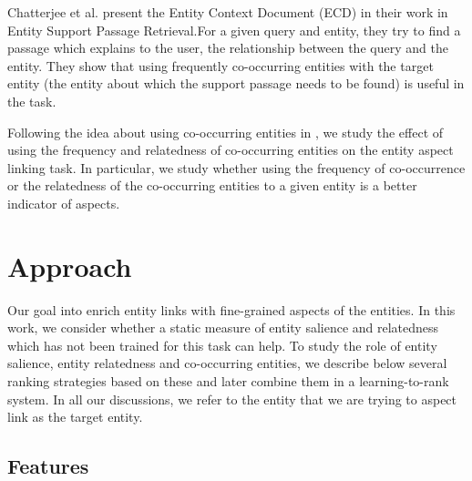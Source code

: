 \documentclass[sigconf,authordraft]{acmart}
\begin{document}
Chatterjee et al. \cite{chatterjee2019why} present the Entity Context Document (ECD) in their work in Entity Support Passage Retrieval.For a given query and entity, they try to find a passage which explains to the user, the relationship between the query and the entity. They show that using frequently co-occurring entities with the target entity (the entity about which the support passage needs to be found) is useful in the task.

Following the idea about using co-occurring entities in \cite{dalton2014entity, chatterjee2019why}, we study the effect of using the frequency and relatedness of co-occurring entities on the entity aspect linking task. In particular, we study whether using the frequency of co-occurrence or the relatedness of the co-occurring entities to a given entity is a better indicator of aspects.

\section{Approach}
\label{sec:Approach}
Our goal into enrich entity links with fine-grained aspects of the entities. In this work, we consider whether a static measure of entity salience and relatedness which has not been trained for this task can help. To study the role of entity salience, entity relatedness and co-occurring entities, we describe below several ranking strategies based on these and later combine them in a learning-to-rank system. In all our discussions, we refer to the entity that we are trying to aspect link as the target entity.

\subsection{Features}
\label{subsec:Features}
\end{document}
